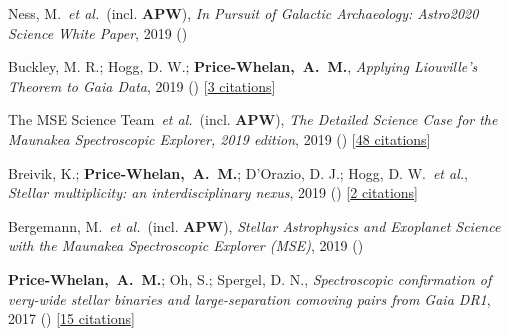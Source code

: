 \item[{\color{deemph}\scriptsize6}]Ness, M.~\textit{et al.}~(incl. \textbf{APW}), \textit{In Pursuit of Galactic Archaeology: Astro2020 Science White Paper}, 2019 ()

\item[{\color{deemph}\scriptsize5}]Buckley, M. R.; Hogg, D. W.; \textbf{Price-Whelan,~A.~M.}, \textit{Applying Liouville's Theorem to Gaia Data}, 2019 () [\href{http://adsabs.harvard.edu/abs/2019arXiv190700987B}{3 citations}]

\item[{\color{deemph}\scriptsize4}]The MSE Science Team~\textit{et al.}~(incl. \textbf{APW}), \textit{The Detailed Science Case for the Maunakea Spectroscopic Explorer, 2019 edition}, 2019 () [\href{http://adsabs.harvard.edu/abs/2019arXiv190404907T}{48 citations}]

\item[{\color{deemph}\scriptsize3}]Breivik, K.; \textbf{Price-Whelan,~A.~M.}; D'Orazio, D. J.; Hogg, D. W.~\textit{et al.}, \textit{Stellar multiplicity: an interdisciplinary nexus}, 2019 () [\href{http://adsabs.harvard.edu/abs/2019arXiv190305094B}{2 citations}]

\item[{\color{deemph}\scriptsize2}]Bergemann, M.~\textit{et al.}~(incl. \textbf{APW}), \textit{Stellar Astrophysics and Exoplanet Science with the Maunakea Spectroscopic Explorer (MSE)}, 2019 ()

\item[{\color{deemph}\scriptsize1}]\textbf{Price-Whelan,~A.~M.}; Oh, S.; Spergel, D. N., \textit{Spectroscopic confirmation of very-wide stellar binaries and large-separation comoving pairs from Gaia DR1}, 2017 () [\href{http://adsabs.harvard.edu/abs/2017arXiv170903532P}{15 citations}]
